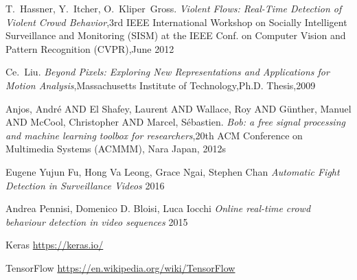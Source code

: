 \cleardoublepage
{}
{}
\begin{thebibliography}{99}

T.~Hassner, Y.~Itcher, O.~Kliper~Gross. \emph{Violent Flows: Real-Time Detection of Violent Crowd Behavior},3rd IEEE International Workshop on Socially Intelligent Surveillance and Monitoring (SISM) at the IEEE Conf. on Computer Vision and Pattern Recognition (CVPR),June 2012

Ce.~Liu. \emph{Beyond Pixels: Exploring New Representations and Applications for Motion Analysis},Massachusetts Institute of Technology,Ph.D. Thesis,2009

Anjos, Andr\'e AND El Shafey, Laurent AND Wallace, Roy AND G\"unther, Manuel AND McCool, Christopher AND Marcel, S\'ebastien. \emph{Bob: a free signal processing and machine learning toolbox for researchers},20th ACM Conference on Multimedia Systems (ACMMM), Nara Japan, 2012s

Eugene Yujun Fu, Hong Va Leong, Grace Ngai, Stephen Chan \emph{Automatic Fight Detection in Surveillance Videos} 2016

Andrea Pennisi, Domenico D. Bloisi, Luca Iocchi \emph{Online real-time crowd behaviour detection in video sequences} 2015

Keras \url{https://keras.io/}

TensorFlow \url{https://en.wikipedia.org/wiki/TensorFlow}




\end{thebibliography}
